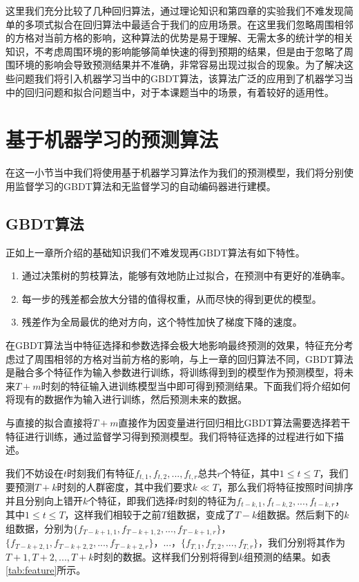 \begin{enumerate}
\end{enumerate}

这里我们充分比较了几种回归算法，通过理论知识和第四章的实验我们不难发现简单的多项式拟合在回归算法中最适合于我们的应用场景。在这里我们忽略周围相邻的方格对当前方格的影响，这种算法的优势是易于理解、无需太多的统计学的相关知识，不考虑周围环境的影响能够简单快速的得到预期的结果，但是由于忽略了周围环境的影响会导致预测结果并不准确，非常容易出现过拟合的现象。为了解决这些问题我们将引入机器学习当中的GBDT算法，该算法广泛的应用到了机器学习当中的回归问题和拟合问题当中，对于本课题当中的场景，有着较好的适用性。

\section{基于机器学习的预测算法}

在这一小节当中我们将使用基于机器学习算法作为我们的预测模型，我们将分别使用监督学习的GBDT算法和无监督学习的自动编码器进行建模。

\subsection{GBDT算法}
正如上一章所介绍的基础知识我们不难发现再GBDT算法有如下特性。

\begin{enumerate}
    \item 通过决策树的剪枝算法，能够有效地防止过拟合，在预测中有更好的准确率。
    \item 每一步的残差都会放大分错的值得权重，从而尽快的得到更优的模型。
    \item 残差作为全局最优的绝对方向，这个特性加快了梯度下降的速度。
\end{enumerate}

在GBDT算法当中特征选择和参数选择会极大地影响最终预测的效果，特征充分考虑过了周围相邻的方格对当前方格的影响，与上一章的回归算法不同，GBDT算法是融合多个特征作为输入参数进行训练，将训练得到到的模型作为预测模型，将未来$T+m$时刻的特征输入进训练模型当中即可得到预测结果。下面我们将介绍如何将现有的数据作为输入进行训练，然后预测未来的数据。

与直接的拟合直接将$T+m$直接作为因变量进行回归相比GBDT算法需要选择若干特征进行训练，通过监督学习得到预测模型。我们将特征选择的过程进行如下描述。

我们不妨设在$t$时刻我们有特征$f_{t,1},f_{t,2},...,f_{t,r}$总共$r$个特征，其中$1 \leq t \leq T$，我们要预测$T+k$时刻的人群密度，其中我们要求$k \ll T$，那么我们将特征按照时间排序并且分别向上错开$k$个特征，即我们选择$t$时刻的特征为$f_{t-k,1},f_{t-k,2},...,f_{t-k,r}$，其中$1 \leq t \leq T$，这样我们相较于之前$T$组数据，变成了$T-k$组数据。然后剩下的$k$组数据，分别为$\{f_{T-k+1,1},f_{T-k+1,2},...,f_{T-k+1,r}\}$，$\{f_{T-k+2,1},f_{T-k+2,2},...,f_{T-k+2,r}\}$，...，$\{f_{T,1},f_{T,2},...,f_{T,r}\}$，我们分别将其作为$T+1, T+2, ..., T+k$时刻的数据。这样我们分别将得到$k$组预测的结果。如表\ref{tab:feature}所示。

